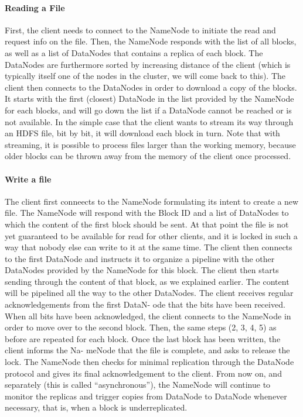 \paragraph{Reading a File}
First, the client needs to connect to the NameNode to initiate the read and request info on the file. Then, the NameNode responds with the list of all blocks, as well as a list of DataNodes that contains a replica of each block. The DataNodes are furthermore sorted by increasing distance of the client (which is typically itself one of the nodes in the cluster, we will come back to this). The client then connects to the DataNodes in order to download a copy of the blocks. It starts with the first (closest) DataNode in the list provided by the NameNode for each blocks, and will go down the list if a DataNode cannot be reached or is not available. In the simple case that the client wants to stream its way through an HDFS file, bit by bit, it will download each block in turn. Note that with streaming, it is possible to process files larger than the working memory, because older blocks can be thrown away from the memory of the client once processed.

\paragraph{Write a file}
The client first conneects to the NameNode formulating its intent to create a new file. The NameNode will respond with the Block ID and a list of DataNodes to which the content of the first block should be sent. At that point the file is not yet guaranteed to be available for read for other clients, and it is locked in such a way that nobody else can write to it at the same time. The client then connects to the first DataNode and instructs it to organize a pipeline with the other DataNodes provided by the NameNode for this block. The client then starts sending through the content of that block, as we explained earlier. The content will be pipelined all the way to the other DataNodes. The client receives regular acknowledgements from the first DataN- ode that the bits have been received. When all bits have been acknowledged, the client connects to the NameNode in order to move over to the second block. Then, the same steps (2, 3, 4, 5) as before are repeated for each block. Once the last block has been written, the client informs the Na- meNode that the file is complete, and asks to release the lock. The NameNode then checks for minimal replication through the DataNode protocol and gives its final acknowledgement to the client. From now on, and separately (this is called “asynchronous”), the NameNode will continue to monitor the replicas and trigger copies from DataNode to DataNode whenever necessary, that is, when a block is underreplicated.

